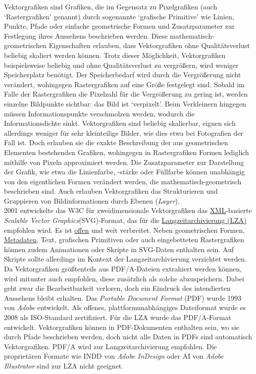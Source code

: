 \documentclass{article}
\begin{document}
    Vektorgrafiken sind Grafiken, die im Gegensatz zu Pixelgrafiken (auch ‘Rastergrafiken’ genannt) durch sogenannte ‘grafische Primitive’ wie Linien, Punkte, Pfade oder einfache geometrische Formen und Zusatzparameter zur Festlegung ihres Aussehens beschrieben werden. Diese mathematisch-geometrischen Eigenschaften erlauben, dass Vektorgrafiken ohne Qualitätsverlust beliebig skaliert werden können. Trotz dieser Möglichkeit, Vektorgrafiken beispielsweise beliebig und ohne Qualitätsverlust zu vergrößern, wird weniger Speicherplatz benötigt. Der Speicherbedarf wird durch die Vergrößerung nicht verändert, wohingegen Rastergrafiken auf eine Größe festgelegt sind. Sobald im Falle der Rastergrafiken die Pixelzahl für die Vergrößerung zu gering ist, werden einzelne Bildpunkte sichtbar: das Bild ist ‘verpixelt’. Beim Verkleinern hingegen müssen Informationspunkte verschmolzen werden, wodurch die Informationsdichte sinkt. Vektorgrafiken sind beliebig skalierbar,  eignen sich allerdings weniger für sehr kleinteilige Bilder, wie dies etwa bei Fotografien der Fall ist. Doch erlauben sie die exakte Beschreibung der aus geometrischen Elementen bestehenden Grafiken, wohingegen in Rastergrafiken Formen lediglich mithilfe von Pixeln approximiert werden. Die Zusatzparameter zur Darstellung der Grafik, wie etwa die Linienfarbe, -stärke oder Füllfarbe können unabhängig von den eigentlichen Formen verändert werden, die mathematisch-geometrisch beschrieben sind. Auch erlauben Vektorgrafiken das Strukturieren und Gruppieren von Bildinformationen durch Ebenen (\emph{Layer}).\\
            
        2001 entwickelte das W3C für zweidimensionale Vektorgrafiken das \href{http://gams.uni-graz.at/o:konde.215}{XML}-basierte \emph{Scalable Vector Graphics}(SVG)-Format, das für die \href{http://gams.uni-graz.at/o:konde.6}{Langzeitarchivierung (LZA)} empfohlen wird. Es ist \href{http://gams.uni-graz.at/o:konde.152}{offen} und weit verbreitet. Neben geometrischen Formen, \href{http://gams.uni-graz.at/o:konde.25}{Metadaten}, Text, grafischen Primitiven oder auch eingebetteten Rastergrafiken können zudem Animationen oder Skripte in SVG-Daten enthalten sein. Auf Skripte sollte allerdings im Kontext der Langzeitarchivierung verzichtet werden. \\
            
        Da Vektorgrafiken größtenteils aus PDF/A-Dateien extrahiert werden können, wird mitunter auch empfohlen, diese zusätzlich als solche abzuspeichern. Dabei geht zwar die Bearbeitbarkeit verloren, doch ein Eindruck des intendierten Aussehens bleibt erhalten. Das \emph{Portable Document Format} (PDF) wurde 1993 von \emph{Adobe} entwickelt. Als offenes, plattformunabhängiges Dateiformat wurde es 2008 als ISO-Standard zertifiziert. Für die LZA wurde das PDF/A-Format entwickelt. Vektorgrafiken können in PDF-Dokumenten enthalten sein, wo sie durch Pfade beschrieben werden, doch nicht alle Daten in PDFs sind automatisch Vektorgrafiken. PDF/A wird zur Langzeitarchivierung empfohlen. Die proprietären Formate wie INDD von \emph{Adobe InDesign} oder AI von \emph{Adobe Illustrator} sind zur LZA nicht geeignet. \\
            
\end{document}
